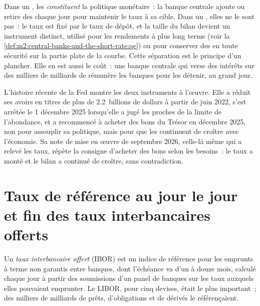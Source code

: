 Dans un , les  \emph{constituent} la politique monétaire~: la
banque centrale ajoute ou retire des  chaque jour pour maintenir le taux à sa cible. Dans un
, elles ne le sont pas~: le taux est fixé par le taux de dépôt, et la taille
du bilan devient un instrument distinct, utilisé pour les rendements à plus long terme
(voir la \cref{def:m2:central-banks-and-the-short-rate:qe}) ou pour conserver
des  en toute sécurité sur la partie plate de la courbe. Cette séparation est le
principe d'un plancher. Elle en est aussi le coût~: une banque centrale qui verse des intérêts sur
des milliers de milliards de  rémunère les banques pour les détenir, au grand jour.

L'histoire récente de la Fed montre les deux instruments à l'œuvre. Elle
a réduit ses avoirs en titres de plus de 2.2~billions de dollars à partir
de juin 2022, s'est arrêtée le 1 décembre 2025 lorsqu'elle a jugé les
 proches de la limite de l'abondance, et a recommencé à acheter
des bons du Trésor en décembre 2025, non pour assouplir sa politique, mais
pour que les  continuent de croître avec l'économie. Sa note de mise
en œuvre de septembre 2026, celle-là même qui a relevé les taux, répète la
consigne d'acheter des bons selon les besoins~: le taux a monté et le bilan a continué de croître, sans contradiction.

\section{Taux de référence au jour le jour et fin des taux interbancaires offerts}

\begin{definition}\label{def:m2:central-banks-and-the-short-rate:ibor}
Un \emph{taux interbancaire offert} (IBOR) est un
indice de référence pour les emprunts à terme non garantis entre banques, dont
l'échéance va d'un à douze mois, calculé chaque jour à partir des soumissions d'un panel de banques sur les taux
auxquels elles pouvaient emprunter. Le LIBOR, pour cinq devises, était le plus important~; des milliers de milliards
de prêts, d'obligations et de dérivés le référençaient.
\end{definition}

